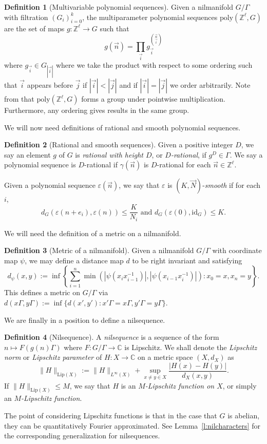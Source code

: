 \documentclass[11pt, a4paper]{amsart}
\theoremstyle{plain}
\newcommand{\eps}{\varepsilon}
\theoremstyle{plain}
\theoremstyle{definition}
\newtheorem{definition}{Definition}
\theoremstyle{remark}
\numberwithin{equation}{section}
\numberwithin{lemma}{section}
\numberwithin{proposition}{section}
\numberwithin{corollary}{section}
\numberwithin{definition}{section}
\numberwithin{claim}{section}
\begin{document}
\begin{definition}[Multivariable polynomial sequences]
Given a nilmanifold $G/\Gamma$ with filtration $(G_i)_{i = 0}^k$, the multiparameter polynomial sequences $\mathrm{poly}(\mathbb{Z}^\ell, G)$ are the set of maps $g\colon \mathbb{Z}^\ell \to G$ such that
$$g(\vec{n}) = \prod_{\vec{i}}g_{\vec{i}}^{\binom{\vec{n}}{\vec{i}}}$$
where $g_{\vec{i}} \in G_{|\vec{i}|}$ where we take the product with respect to some ordering such that $\vec{i}$ appears before $\vec{j}$ if $|\vec{i}| < |\vec{j}|$ and if $|\vec{i}| = |\vec{j}|$ we order arbitrarily. Note from \cite[Chapter 14]{HK18} that $\mathrm{poly}(\mathbb{Z}^\ell, G)$ forms a group under pointwise multiplication. Furthermore, any ordering gives results in the same group. 
\end{definition}
We will now need definitions of rational and smooth polynomial sequences.
\begin{definition}[Rational and smooth sequences] Given a positive integer $D$, we say an element $g$ of $G$ is \emph{rational with height $D$}, or \emph{$D$-rational}, if $g^D \in \Gamma$. We say a polynomial sequence is $D$-rational if $\gamma(\vec{n})$ is $D$-rational for each $\vec{n} \in\mathbb{Z}^\ell$.

Given a polynomial sequence $\eps(\vec{n})$, we say that $\eps$ is $(K, \vec{N})$-\emph{smooth} if for each $i$,
$$d_{G}(\eps(n + e_i), \eps(n)) \le \frac{K}{N_i} \text{ and } d_{G}(\eps(0), \mathrm{id}_G) \le K.$$
\end{definition}
We will need the definition of a metric on a nilmanifold.
\begin{definition}[Metric of a nilmanifold]\label{d:metricnilmanifold}
Given a nilmanifold $G/\Gamma$ with coordinate map $\psi$, we may define a distance map $d$ to be right invariant and satisfying
$$d_{\psi}(x, y) := \inf\left\{\sum_{i = 1}^n \min(|\psi(x_ix_{i - 1}^{-1})|, |\psi(x_{i - 1}x_i^{-1})|): x_0 = x, x_n = y\right\}.$$
This defines a metric on $G/\Gamma$ via $d(x\Gamma, y\Gamma) := \inf\{d(x', y'): x'\Gamma = x\Gamma, y'\Gamma = y\Gamma\}$.    
\end{definition}
We are finally in a position to define a nilsequence.
\begin{definition}[Nilsequence]
A \emph{nilsequence} is a sequence of the form $n \mapsto F(g(n)\Gamma)$ where $F\colon G/\Gamma \to \mathbb{C}$ is Lipschitz. We shall denote the \emph{Lipschitz norm} or \emph{Lipschitz parameter} of $H\colon X \to \mathbb{C}$ on a metric space $(X, d_X)$ as
$$\|H\|_{\mathrm{Lip}(X)} := \|H\|_{L^\infty(X)} + \sup_{x \neq y \in X} \frac{|H(x) - H(y)|}{d_X(x, y)}.$$
If $\|H\|_{\mathrm{Lip}(X)} \le M$, we say that $H$ is an \emph{$M$-Lipschitz function on $X$}, or simply an \emph{$M$-Lipschitz function}.
\end{definition}
The point of considering Lipschitz functions is that in the case that $G$ is abelian, they can be quantitatively Fourier approximated. See Lemma~\ref{l:nilcharacters} for the corresponding generalization for nilsequences.
\end{document}
